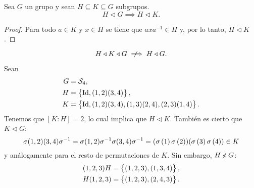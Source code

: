 \begin{prop}
    Sea $G$ un grupo y sean $H \subseteq K \subseteq G$ subgrupos.
    \[
        H \triangleleft G \implies H \triangleleft K.
    \]
\end{prop}

\begin{proof}
    Para todo $a \in K$ y $x \in H$ se tiene que $axa^{-1} \in H$ y, por lo tanto, $H \triangleleft K$.
\end{proof}

\begin{obs}
    \[
        H \triangleleft K \triangleleft G \notimplies H \triangleleft G.
    \]
\end{obs}

\begin{example}
    Sean
    \begin{align*}
        G &= \mathcal{S}_4,\\
        H &= \left\{ \operatorname{Id}, (1,2)(3,4)\right\}, \\
        K &= \left\{ \operatorname{Id}, (1,2)(3,4), (1,3)(2,4), (2,3)(1,4)\right\}.
    \end{align*}
    Tenemos que $[K : H] = 2$, lo cual implica que $H \triangleleft K$. También es cierto que $K \triangleleft G$:
    \[
        \sigma(1,2)(3,4)\sigma^{-1} = \sigma(1,2)\sigma^{-1}\sigma(3,4)\sigma^{-1} = (\sigma\left( 1\right) \sigma\left( 2\right))
        (\sigma\left( 3\right) \sigma\left( 4\right)) \in K
    \]
    y análogamente para el resto de permutaciones de $K$. Sin embargo,
    $H \centernot\triangleleft G$:
    \[
        \begin{aligned}
            (1,2,3)H &= \left\{(1,2,3), (1,3,4)\right\}, \\
            H(1,2,3) &= \left\{(1,2,3), (2,4,3)\right\}.
        \end{aligned}
    \]
\end{example}

